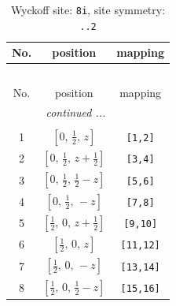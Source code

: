 \documentclass[fleqn,8pt]{jsarticle}
\begin{document}
\begin{longtable}{ccc}
\caption{Wyckoff site: {\tt 8i}, site symmetry: {\tt ..2}}
 \\
 \hline \hline
No. & position & mapping \\ \hline \endfirsthead

\multicolumn{2}{l}{\tablename\ \thetable{}} \\
 \hline \hline
No. & position & mapping \\ \hline \endhead

 \hline \hline
\multicolumn{2}{r}{\footnotesize\it continued ...} \\ \endfoot

 \hline \hline
\multicolumn{2}{r}{} \\ \endlastfoot

1 & $\left[ 0,\, \frac{1}{2},\, z \right]$ & {\tt [1,2]} \\ \hline
2 & $\left[ 0,\, \frac{1}{2},\, z + \frac{1}{2} \right]$ & {\tt [3,4]} \\ \hline
3 & $\left[ 0,\, \frac{1}{2},\, \frac{1}{2} - z \right]$ & {\tt [5,6]} \\ \hline
4 & $\left[ 0,\, \frac{1}{2},\, - z \right]$ & {\tt [7,8]} \\ \hline
5 & $\left[ \frac{1}{2},\, 0,\, z + \frac{1}{2} \right]$ & {\tt [9,10]} \\ \hline
6 & $\left[ \frac{1}{2},\, 0,\, z \right]$ & {\tt [11,12]} \\ \hline
7 & $\left[ \frac{1}{2},\, 0,\, - z \right]$ & {\tt [13,14]} \\ \hline
8 & $\left[ \frac{1}{2},\, 0,\, \frac{1}{2} - z \right]$ & {\tt [15,16]} \\
\end{longtable}
\renewcommand{\arraystretch}{1.2}
\end{document}
